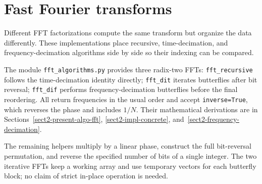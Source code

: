 \begin{listing}[H]
\caption{The paired-frequency twiddle operator for the FHT.}
\label{listing-operator_chi}
\end{listing}

\begin{listing}[H]
\caption{Circular convolution from Hartley transforms of both inputs.}
\label{listing-fht_convol}
\end{listing}

\section{Fast Fourier transforms}
\label{sect1-listing-fft}

Different FFT factorizations compute the same transform but organize the
data differently. These implementations place recursive, time-decimation,
and frequency-decimation algorithms side by side so their indexing can be
compared.

The module \texttt{fft\_algorithms.py} provides three radix-two FFTs:
\texttt{fft\_recursive} follows the time-decimation identity directly;
\texttt{fft\_dit} iterates butterflies after bit reversal;
\texttt{fft\_dif} performs frequency-decimation butterflies before the
final reordering. All return frequencies in the usual order and accept
\texttt{inverse=True}, which reverses the phase and includes $1/N$.
Their mathematical derivations are in Sections~\ref{sect2-present-algo-fft},
\ref{sect2-impl-concrete}, and~\ref{sect2-frequency-decimation}.

The remaining helpers multiply by a linear phase, construct the full
bit-reversal permutation, and reverse the specified number of bits of
a single integer. The two iterative FFTs keep a working array and use
temporary vectors for each butterfly block; no claim of strict in-place
operation is needed.
\begin{listing}[H]
\caption{A recursive radix-two FFT, with inverse support.}
\label{listing-fft-rec}
\end{listing}

\begin{listing}[H]
\caption{An iterative FFT with decimation in time.}
\label{listing-fft_dit}
\end{listing}

\begin{listing}[H]
\caption{An iterative FFT with decimation in frequency.}
\label{listing-fft_dif}
\end{listing}

